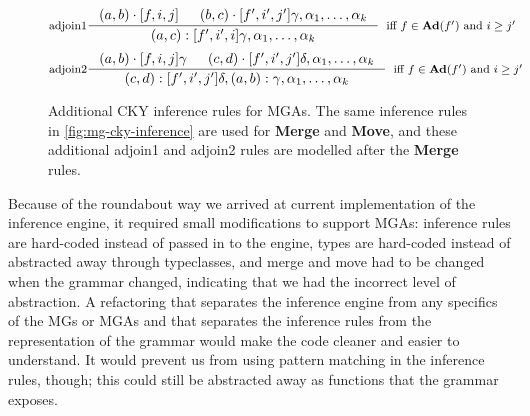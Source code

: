 \documentclass{article}
\begin{document}
\begin{figure}[h]
  \centering
  \[
    \inference[adjoin1]{
      (a, b) \cdot [f,i,j] &
      (b, c) \cdot [f',i',j'] \gamma, \alpha_1, \dots, \alpha_k
    }{
      (a, c) : [f', i', i]\gamma, \alpha_1, \dots, \alpha_k
    }[iff $f \in \mathbf{Ad}(f')$ and $i \geq j'$]
  \]
  \[
    \inference[adjoin2]{
      (a, b) \cdot [f,i,j] \gamma &
      (c, d) \cdot [f',i',j'] \delta, \alpha_1, \dots, \alpha_k
    }{
      (c, d) : [f', i', j']\delta, (a, b) : \gamma, \alpha_1, \dots, \alpha_k
    }[iff $f \in \mathbf{Ad}(f')$ and $i \geq j'$]
  \]
  \caption{Additional CKY inference rules for MGAs.  The same
    inference rules in \ref{fig:mg-cky-inference} are used for
    \textbf{Merge} and \textbf{Move}, and these additional adjoin1 and
    adjoin2 rules are modelled after the \textbf{Merge} rules.}
  \label{fig:mga-cky-inference}
\end{figure}

Because of the roundabout way we arrived at current implementation of
the inference engine, it required small modifications to support MGAs:
inference rules are hard-coded instead of passed in to the engine,
types are hard-coded instead of abstracted away through typeclasses,
and merge and move had to be changed when the grammar changed,
indicating that we had the incorrect level of abstraction.  A
refactoring that separates the inference engine from any specifics of
the MGs or MGAs and that separates the inference rules from the
representation of the grammar would make the code cleaner and easier
to understand.  It would prevent us from using pattern matching in the
inference rules, though; this could still be abstracted away as
functions that the grammar exposes.
\end{document}

